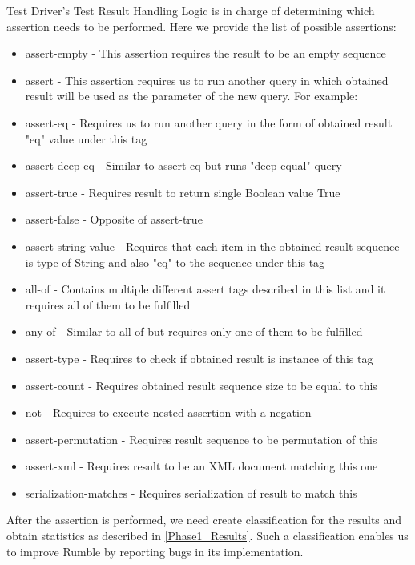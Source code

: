 Test Driver's Test Result Handling Logic is in charge of determining which assertion needs to be performed. Here we provide the list of possible assertions:

\begin{itemize}
	\item assert-empty - This assertion requires the result to be an empty sequence
	\item assert - This assertion requires us to run another query in which obtained result will be used as the parameter of the new query. For example:
	
	\item assert-eq - Requires us to run another query in the form of obtained result "eq" value under this tag
	\item assert-deep-eq - Similar to assert-eq but runs "deep-equal" query
	\item assert-true - Requires result to return single Boolean value True
	\item assert-false - Opposite of assert-true
	\item assert-string-value - Requires that each item in the obtained result sequence is type of String and also "eq" to the sequence under this tag
	\item all-of - Contains multiple different assert tags described in this list and it requires all of them to be fulfilled 
	\item any-of - Similar to all-of but requires only one of them to be fulfilled
	\item assert-type - Requires to check if obtained result is instance of this tag
	\item assert-count - Requires obtained result sequence size to be equal to this
	\item not - Requires to execute nested assertion with a negation
	\item assert-permutation - Requires result sequence to be permutation of this
	\item assert-xml - Requires result to be an XML document matching this one
	\item serialization-matches - Requires serialization of result to match this
\end{itemize}

After the assertion is performed, we need create classification for the results and obtain statistics as described in \ref{Phase1_Results}. Such a classification enables us to improve Rumble by reporting bugs in its implementation.

